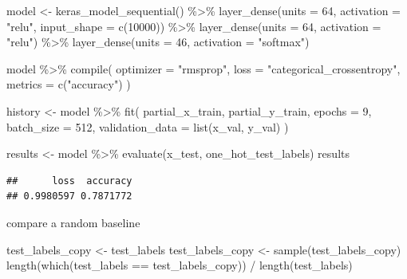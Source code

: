 \documentclass[]{article}
\newenvironment{Shaded}{\begin{snugshade}}{\end{snugshade}}
\newcommand{\AttributeTok}[1]{\textcolor[rgb]{0.77,0.63,0.00}{#1}}
\newcommand{\DecValTok}[1]{\textcolor[rgb]{0.00,0.00,0.81}{#1}}
\newcommand{\FunctionTok}[1]{\textcolor[rgb]{0.00,0.00,0.00}{#1}}
\newcommand{\NormalTok}[1]{#1}
\newcommand{\OtherTok}[1]{\textcolor[rgb]{0.56,0.35,0.01}{#1}}
\newcommand{\SpecialCharTok}[1]{\textcolor[rgb]{0.00,0.00,0.00}{#1}}
\newcommand{\StringTok}[1]{\textcolor[rgb]{0.31,0.60,0.02}{#1}}
\begin{document}
\begin{Shaded}
\begin{Highlighting}[]
\NormalTok{model }\OtherTok{\textless{}{-}} \FunctionTok{keras\_model\_sequential}\NormalTok{() }\SpecialCharTok{\%\textgreater{}\%}
  \FunctionTok{layer\_dense}\NormalTok{(}\AttributeTok{units =} \DecValTok{64}\NormalTok{, }\AttributeTok{activation =} \StringTok{"relu"}\NormalTok{, }\AttributeTok{input\_shape =} \FunctionTok{c}\NormalTok{(}\DecValTok{10000}\NormalTok{)) }\SpecialCharTok{\%\textgreater{}\%} 
  \FunctionTok{layer\_dense}\NormalTok{(}\AttributeTok{units =} \DecValTok{64}\NormalTok{, }\AttributeTok{activation =} \StringTok{"relu"}\NormalTok{) }\SpecialCharTok{\%\textgreater{}\%}
  \FunctionTok{layer\_dense}\NormalTok{(}\AttributeTok{units =} \DecValTok{46}\NormalTok{, }\AttributeTok{activation =} \StringTok{"softmax"}\NormalTok{)}

\NormalTok{model }\SpecialCharTok{\%\textgreater{}\%} \FunctionTok{compile}\NormalTok{(}
  \AttributeTok{optimizer =} \StringTok{"rmsprop"}\NormalTok{,}
  \AttributeTok{loss =} \StringTok{"categorical\_crossentropy"}\NormalTok{, }
  \AttributeTok{metrics =} \FunctionTok{c}\NormalTok{(}\StringTok{"accuracy"}\NormalTok{)}
\NormalTok{)}

\NormalTok{history }\OtherTok{\textless{}{-}}\NormalTok{ model }\SpecialCharTok{\%\textgreater{}\%} \FunctionTok{fit}\NormalTok{(}
\NormalTok{  partial\_x\_train, }
\NormalTok{  partial\_y\_train,}
  \AttributeTok{epochs =} \DecValTok{9}\NormalTok{,}
  \AttributeTok{batch\_size =} \DecValTok{512}\NormalTok{,}
  \AttributeTok{validation\_data =} \FunctionTok{list}\NormalTok{(x\_val, y\_val)}
\NormalTok{)}

\NormalTok{results }\OtherTok{\textless{}{-}}\NormalTok{ model }\SpecialCharTok{\%\textgreater{}\%} \FunctionTok{evaluate}\NormalTok{(x\_test, one\_hot\_test\_labels)}
\NormalTok{results}
\end{Highlighting}
\end{Shaded}

\begin{verbatim}
##      loss  accuracy 
## 0.9980597 0.7871772
\end{verbatim}

compare a random baseline

\begin{Shaded}
\begin{Highlighting}[]
\NormalTok{test\_labels\_copy }\OtherTok{\textless{}{-}}\NormalTok{ test\_labels}
\NormalTok{test\_labels\_copy }\OtherTok{\textless{}{-}} \FunctionTok{sample}\NormalTok{(test\_labels\_copy)}
\FunctionTok{length}\NormalTok{(}\FunctionTok{which}\NormalTok{(test\_labels }\SpecialCharTok{==}\NormalTok{ test\_labels\_copy)) }\SpecialCharTok{/} \FunctionTok{length}\NormalTok{(test\_labels)}
\end{Highlighting}
\end{Shaded}
\end{document}
